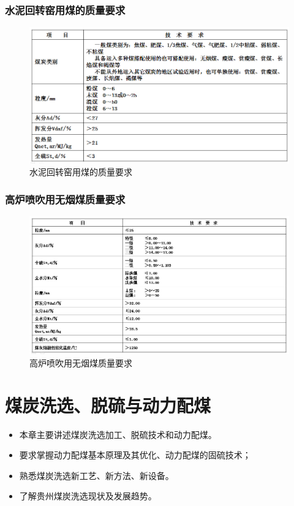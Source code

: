 \documentclass[10pt,openany]{ctexbook}
\begin{document}
\subsection{水泥回转窑用煤的质量要求}
 \begin{figure}[!ht]
\includegraphics[scale=0.6]{17}
\caption{水泥回转窑用煤的质量要求}
\end{figure}

\subsection{高炉喷吹用无烟煤质量要求}
 \begin{figure}[!ht]
\includegraphics[scale=0.6]{18}
\caption{高炉喷吹用无烟煤质量要求}
\end{figure}

\chapter{煤炭洗选、脱硫与动力配煤}
\begin{itemize}
\item 本章主要讲述煤炭洗选加工、脱硫技术和动力配煤。
 \item 要求掌握动力配煤基本原理及其优化、动力配煤的固硫技术；
\item 熟悉煤炭洗选新工艺、新方法、新设备。
\item 了解贵州煤炭洗选现状及发展趋势。
\end{itemize}
\end{document}
